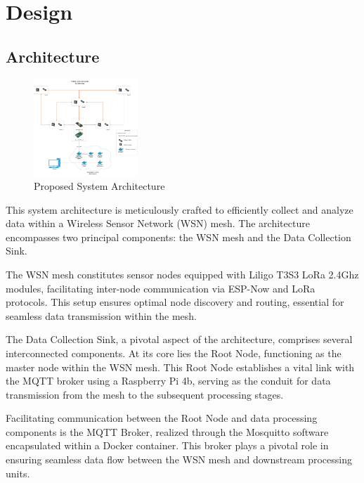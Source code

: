 \section{Design}\label{design}


\subsection{Architecture}\label{architecture}

\begin{figure}[h]
  \begin{center}
    \includegraphics[width=0.35\textwidth]{./Figures/architecture.png}
  \end{center}
  \caption{Proposed System Architecture}\label{architecture}
\end{figure}

This system architecture is meticulously crafted to efficiently collect and analyze data within a Wireless Sensor Network (WSN) mesh. The architecture encompasses two principal components: the WSN mesh and the Data Collection Sink.

The WSN mesh constitutes sensor nodes equipped with Liligo T3S3 LoRa 2.4Ghz modules, facilitating inter-node communication via ESP-Now and LoRa protocols. This setup ensures optimal node discovery and routing, essential for seamless data transmission within the mesh.

The Data Collection Sink, a pivotal aspect of the architecture, comprises several interconnected components. At its core lies the Root Node, functioning as the master node within the WSN mesh. This Root Node establishes a vital link with the MQTT broker using a Raspberry Pi 4b, serving as the conduit for data transmission from the mesh to the subsequent processing stages.

Facilitating communication between the Root Node and data processing components is the MQTT Broker, realized through the Mosquitto software encapsulated within a Docker container. This broker plays a pivotal role in ensuring seamless data flow between the WSN mesh and downstream processing units.

